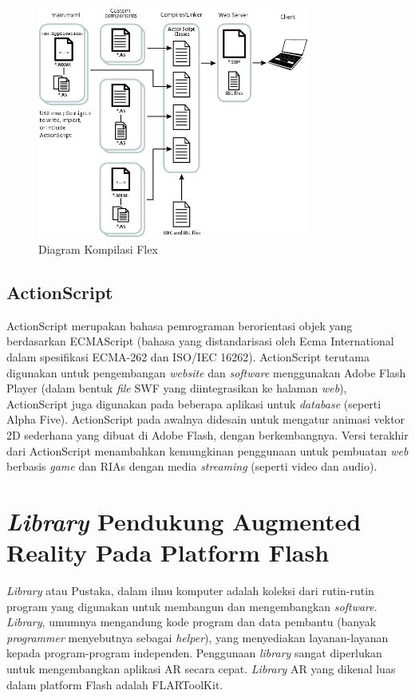 \begin{figure}
\begin{center}
\includegraphics[width=9cm]{./images/compile_flex.png}
\caption{\label{fig:compile_flex} Diagram Kompilasi Flex}
\end{center}
\end{figure}

\subsection {ActionScript}
\label{subsec:action_script}
ActionScript merupakan bahasa pemrograman berorientasi objek yang berdasarkan ECMAScript (bahasa yang distandarisasi oleh Ecma International dalam spesifikasi ECMA-262 dan ISO/IEC 16262). ActionScript  terutama digunakan untuk pengembangan \textit{website} dan \textit{software} menggunakan Adobe Flash Player (dalam bentuk \textit{file} SWF yang diintegrasikan  ke halaman \textit{web}), ActionScript juga digunakan pada beberapa aplikasi untuk \textit{database}  (seperti Alpha Five). ActionScript pada awalnya didesain untuk mengatur animasi vektor 2D sederhana yang dibuat di Adobe Flash, dengan berkembangnya. Versi terakhir dari ActionScript menambahkan kemungkinan penggunaan  untuk pembuatan \textit{web} berbasis \textit{game} dan RIAs dengan media \textit{streaming} (seperti video dan audio).

\section{\textit{Library} Pendukung Augmented Reality Pada Platform Flash}
\label {sec:library_AR}
\textit{Library} atau Pustaka, dalam ilmu komputer adalah koleksi dari rutin-rutin program yang digunakan untuk membangun dan mengembangkan \textit{software}. \textit{Library}, umumnya mengandung kode program dan data pembantu (banyak \textit{programmer} menyebutnya sebagai \textit{helper}), yang menyediakan layanan-layanan kepada program-program independen. Penggunaan \textit{library} sangat diperlukan untuk mengembangkan aplikasi AR secara cepat. \textit{Library} AR yang dikenal luas dalam platform Flash adalah FLARToolKit.

